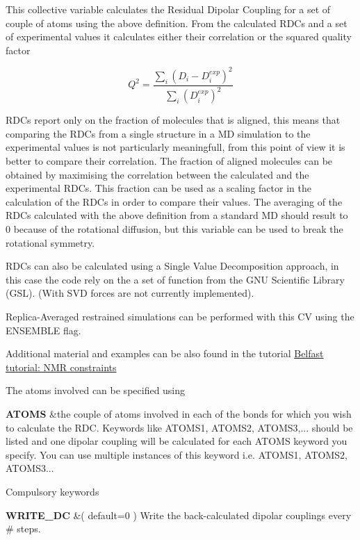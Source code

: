 This collective variable calculates the Residual Dipolar Coupling for a set of couple of atoms using the above definition. From the calculated R\+D\+Cs and a set of experimental values it calculates either their correlation or the squared quality factor

\[ Q^2=\frac{\sum_i(D_i-D^{exp}_i)^2}{\sum_i(D^{exp}_i)^2} \]

R\+D\+Cs report only on the fraction of molecules that is aligned, this means that comparing the R\+D\+Cs from a single structure in a M\+D simulation to the experimental values is not particularly meaningfull, from this point of view it is better to compare their correlation. The fraction of aligned molecules can be obtained by maximising the correlation between the calculated and the experimental R\+D\+Cs. This fraction can be used as a scaling factor in the calculation of the R\+D\+Cs in order to compare their values. The averaging of the R\+D\+Cs calculated with the above definition from a standard M\+D should result to 0 because of the rotational diffusion, but this variable can be used to break the rotational symmetry.

R\+D\+Cs can also be calculated using a Single Value Decomposition approach, in this case the code rely on the a set of function from the G\+N\+U Scientific Library (G\+S\+L). (With S\+V\+D forces are not currently implemented).

Replica-\/\+Averaged restrained simulations can be performed with this C\+V using the E\+N\+S\+E\+M\+B\+L\+E flag.

Additional material and examples can be also found in the tutorial \hyperlink{belfast-9}{Belfast tutorial\+: N\+M\+R constraints}

\begin{DoxyParagraph}{The atoms involved can be specified using}

\end{DoxyParagraph}
\begin{TabularC}{2}
\hline
{\bfseries  A\+T\+O\+M\+S } &the couple of atoms involved in each of the bonds for which you wish to calculate the R\+D\+C. Keywords like A\+T\+O\+M\+S1, A\+T\+O\+M\+S2, A\+T\+O\+M\+S3,... should be listed and one dipolar coupling will be calculated for each A\+T\+O\+M\+S keyword you specify. You can use multiple instances of this keyword i.\+e. A\+T\+O\+M\+S1, A\+T\+O\+M\+S2, A\+T\+O\+M\+S3...   \\
\end{TabularC}


\begin{DoxyParagraph}{Compulsory keywords}

\end{DoxyParagraph}
\begin{TabularC}{2}
\hline
{\bfseries  W\+R\+I\+T\+E\+\_\+\+D\+C } &( default=0 ) Write the back-\/calculated dipolar couplings every \# steps.   \\
\end{TabularC}


